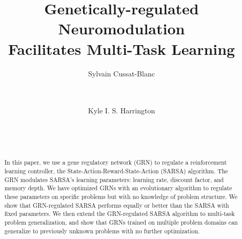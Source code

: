 \documentclass{sig-alternate-2}
\title{Genetically-regulated Neuromodulation\\
    Facilitates Multi-Task Learning}
\author{
\alignauthor
Sylvain Cussat-Blanc\\
\affaddr{University of Toulouse}\\
\affaddr{21 All\'ee de Brienne} \\
\affaddr{31042 Toulouse, France}
\email{cussat@irit.fr}
\and
\alignauthor
Kyle I. S. Harrington\\
\affaddr{Beth Israel Deaconess Medical Center}\\
\affaddr{Harvard Medical School}\\
\affaddr{02215 Boston, MA} \\
\email{kharrin3@bidmc.harvard.edu}
}
\date{}
\begin{document}
\maketitle

\begin{abstract}
In this paper, we use a gene regulatory network (GRN) to regulate a reinforcement learning controller, the State-Action-Reward-State-Action (SARSA) algorithm. The GRN modulates SARSA's learning parameters: learning rate, discount factor, and memory depth. We have optimized GRNs with an evolutionary algorithm to regulate these parameters on specific problems but with no knowledge of problem structure. We show that GRN-regulated SARSA performs equally or better than the SARSA with fixed parameters. We then extend the GRN-regulated SARSA algorithm to multi-task problem generalization, and show that GRNs trained on multiple problem domains can generalize to previously unknown problems with no further optimization. 
\end{abstract}
















\end{document}
